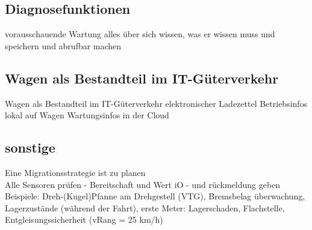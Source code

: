 \subsection{Diagnosefunktionen}
vorausschauende Wartung
alles über sich wissen, was er wissen muss und speichern und abrufbar machen

\subsection{Wagen als Bestandteil im IT-Güterverkehr}
Wagen als Bestandteil im IT-Güterverkehr
elektronischer Ladezettel
Betriebsinfos lokal auf Wagen
Wartungsinfos in der Cloud

\subsection{sonstige}
Eine Migrationsstrategie ist zu planen\\
Alle Sensoren prüfen - Bereitschaft und Wert iO - und rückmeldung geben
Beispiele: Dreh-(Kugel)Pfanne am Drehgestell (VTG), Bremsbelag überwachung, Lagerzustände (während der Fahrt), erste Meter: Lagerschaden, Flachstelle, Entgleisungssicherheit (vRang = 25 km/h)